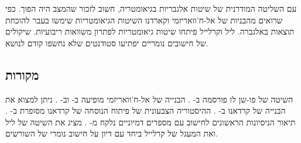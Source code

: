 עם השליטה המודרנית של שיטות אלגבריות בגיאומטריה, חשוב לזכור שהמצב היה הפוך. כפי שרואים מהבניות של אל-ח'וואריזמי וקארדנו
השיטות הגיאומטריות שימשו בעבר להוכחת תוצאות באלגברה. ליל וקרלייל 
פיתחו שיטות גיאומטריות לפתרון משוואות ריבועיות. שיקולים של חישובים נומריים יפתיעו סטודנטים שלא נחשפו קודם לנושא.

\subsection*{מקורות}
השיטה של פו-שן לו 
פורסמה ב-%
\cite{loh1,loh2}.
הבנייה של אל-ח'וואריזמי
מופיעה ב-%
\cite[פרק 1]{jorg}
וב-%
\cite{mastin}.
ניתן למצוא את הבנייה של קרדאנו
ב-%
\cite[פרק 1]{jorg}.
ההיסטוריה הצבעונית של פיתוח הנוסחה של קרדאנו
מסופרת ב-%
\cite{wiki:cardano}.
תיאור הניסיונות הראשונים לחישוב עם מספרים דמיוניים נלקח מ-%
\cite[פרק 2]{jorg}. 
\cite{wiki:quadratic}
מציג את השיטה של ליל
ואת המעגל של קרלייל 
ביחד עם דיון על חישוב נומרי של השורשים.

